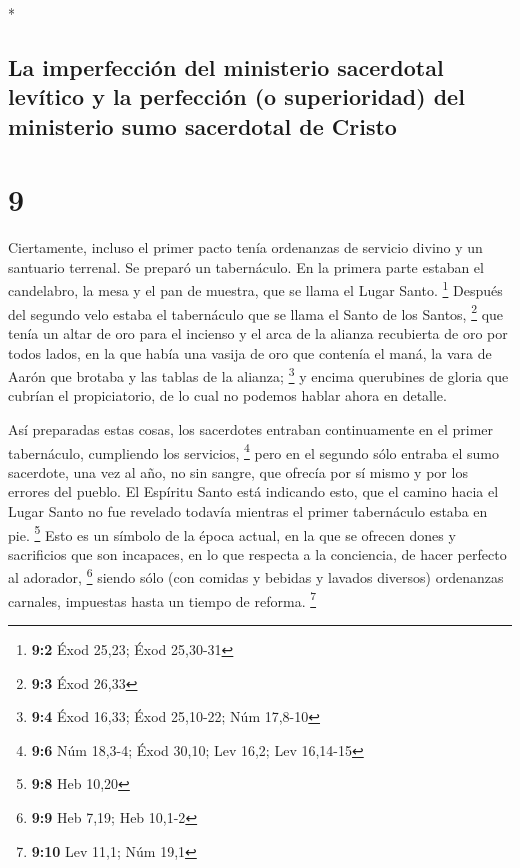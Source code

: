 \begin{paracol}{2}
\begin{otherlanguage}{english}
\end{otherlanguage}

\switchcolumn[0]*

\hypertarget{la-imperfecciuxf3n-del-ministerio-sacerdotal-levuxedtico-y-la-perfecciuxf3n-o-superioridad-del-ministerio-sumo-sacerdotal-de-cristo}{%
\subsection{La imperfección del ministerio sacerdotal levítico y la
perfección (o superioridad) del ministerio sumo sacerdotal de
Cristo}\label{la-imperfecciuxf3n-del-ministerio-sacerdotal-levuxedtico-y-la-perfecciuxf3n-o-superioridad-del-ministerio-sumo-sacerdotal-de-cristo}}

\hypertarget{section-16}{%
\section{9}\label{section-16}}

 Ciertamente, incluso el primer pacto tenía ordenanzas de
servicio divino y un santuario terrenal.  Se preparó un
tabernáculo. En la primera parte estaban el candelabro, la mesa y el pan
de muestra, que se llama el Lugar Santo. \footnote{\textbf{9:2} Éxod
  25,23; Éxod 25,30-31}  Después del segundo velo estaba
el tabernáculo que se llama el Santo de los Santos, \footnote{\textbf{9:3}
  Éxod 26,33}  que tenía un altar de oro para el incienso
y el arca de la alianza recubierta de oro por todos lados, en la que
había una vasija de oro que contenía el maná, la vara de Aarón que
brotaba y las tablas de la alianza; \footnote{\textbf{9:4} Éxod 16,33;
  Éxod 25,10-22; Núm 17,8-10}  y encima querubines de
gloria que cubrían el propiciatorio, de lo cual no podemos hablar ahora
en detalle.

 Así preparadas estas cosas, los sacerdotes entraban
continuamente en el primer tabernáculo, cumpliendo los servicios,
\footnote{\textbf{9:6} Núm 18,3-4; Éxod 30,10; Lev 16,2; Lev 16,14-15}
 pero en el segundo sólo entraba el sumo sacerdote, una
vez al año, no sin sangre, que ofrecía por sí mismo y por los errores
del pueblo.  El Espíritu Santo está indicando esto, que el
camino hacia el Lugar Santo no fue revelado todavía mientras el primer
tabernáculo estaba en pie. \footnote{\textbf{9:8} Heb 10,20}
 Esto es un símbolo de la época actual, en la que se
ofrecen dones y sacrificios que son incapaces, en lo que respecta a la
conciencia, de hacer perfecto al adorador, \footnote{\textbf{9:9} Heb
  7,19; Heb 10,1-2}  siendo sólo (con comidas y bebidas y
lavados diversos) ordenanzas carnales, impuestas hasta un tiempo de
reforma. \footnote{\textbf{9:10} Lev 11,1; Núm 19,1}


\end{paracol}

